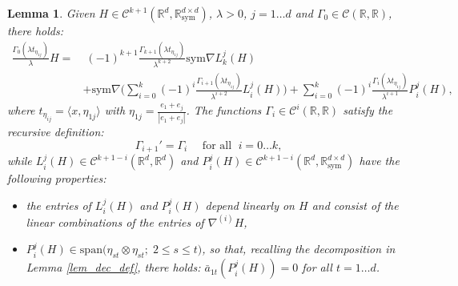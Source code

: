\documentclass[10pt,a4paper]{amsart}
\newtheorem{lemma}{Lemma}
\newcommand{\R}{\mathbb{R}}
\newcommand{\sym}{\mathrm{sym}}
\begin{document}
\begin{lemma}\label{lem_IBP}
Given  $H\in\mathcal{C}^{k+1}(\R^d,\R^{d\times d}_\sym)$, $\lambda>0$,
$j=1\ldots d$ and $\Gamma_0\in\mathcal{C}(\R,\R)$, there holds:
\begin{equation}\label{ibp}
\begin{split}
\frac{\Gamma_0(\lambda t_{\eta_{1j}})}{\lambda}H = & \; (-1)^{k+1}\frac{\Gamma_{k+1}(\lambda
  t_{\eta_{1j}})}{\lambda^{k+2}} \sym\nabla L^{j}_k(H)  \\ & + \sym\nabla
\Big(\sum_{i=0}^k(-1)^i\frac{\Gamma_{i+1}(\lambda t_{\eta_{1j}})}{\lambda^{i+2}}L_i^j(H)\Big) 
+ \sum_{i=0}^{k}(-1)^i\frac{\Gamma_i(\lambda t_{\eta_{1j}})}{\lambda^{i+1}} P_i^j(H),
\end{split}
\end{equation}
where $t_{\eta_{ij}}=\langle x, \eta_{1j}\rangle$ with
$\eta_{1j} = \frac{e_1+e_j}{|e_1+e_j|}$. The functions $\Gamma_i\in
\mathcal{C}^{i}(\R,\R)$ satisfy the recursive definition: 
\begin{equation}\label{recu_ibp}
\Gamma_{i+1}' = \Gamma_{i}  \quad\mbox{ for all } \; i =0\ldots k,
\end{equation}
while $L_i^j(H)\in\mathcal{C}^{k+1-i}(\R^d,\R^d)$ and
$P_i^j(H)\in\mathcal{C}^{k+1-i}(\R^d,\R^{d\times d}_\sym)$ have the following properties:
\begin{itemize}
\item[(i)] the entries of $L_i^j(H)$ and $P_i^j(H)$ depend linearly on
  $H$ and consist of the linear combinations of the entries
  of $\nabla^{(i)}H$, 
\item[(ii)] $P_i^j(H)\in\mathrm{span}\big(\eta_{st}\otimes
  \eta_{st};\; 2\leq s\leq t\big)$, so that, recalling the
  decomposition in Lemma \ref{lem_dec_def}, there holds: $\bar
  a_{1t}(P_i^j(H))=0$ for all $t=1\ldots d$.
\end{itemize}
\end{lemma}
\end{document}
